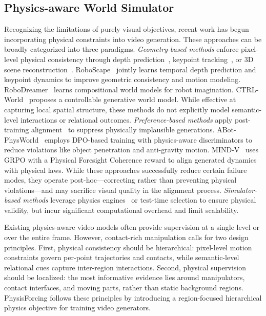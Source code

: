 \documentclass{llmxive}
\begin{document}
\subsection{Physics-aware World Simulator}

Recognizing the limitations of purely visual objectives, recent work has begun incorporating physical constraints into video generation. These approaches can be broadly categorized into three paradigms. \textit{Geometry-based methods} enforce pixel-level physical consistency through depth prediction~\cite{yang2024depth,video_depth_anything}, keypoint tracking~\cite{karaev2023cotracker,karaev24cotracker3,harley2025alltracker}, or 3D scene reconstruction~\cite{zhen2025tesseract}. RoboScape~\cite{shang2025roboscape} jointly learns temporal depth prediction and keypoint dynamics to improve geometric consistency and motion modeling. RoboDreamer~\cite{zhou2024robodreamer} learns compositional world models for robot imagination. CTRL-World~\cite{guo2025ctrl} proposes a controllable generative world model. While effective at capturing local spatial structure, these methods do not explicitly model semantic-level interactions or relational outcomes. \textit{Preference-based methods} apply post-training alignment~\cite{ouyang2022training,rafailov2024direct} to suppress physically implausible generations. ABot-PhysWorld~\cite{ali2025abot} employs DPO-based training with physics-aware discriminators to reduce violations like object penetration and anti-gravity motion. MIND-V~\cite{zhang2026mind} uses GRPO with a Physical Foresight Coherence reward to align generated dynamics with physical laws. While these approaches successfully reduce certain failure modes, they operate post-hoc—correcting rather than preventing physical violations—and may sacrifice visual quality in the alignment process. \textit{Simulator-based methods} leverage physics engines~\cite{wang2023robogen,yang2025physics} or test-time selection to ensure physical validity, but incur significant computational overhead and limit scalability.

Existing physics-aware video models often provide supervision at a single level or over the entire frame. However, contact-rich manipulation calls for two design principles. First, physical consistency should be hierarchical: pixel-level motion constraints govern per-point trajectories and contacts, while semantic-level relational cues capture inter-region interactions. Second, physical supervision should be localized: the most informative evidence lies around manipulators, contact interfaces, and moving parts, rather than static background regions. PhysisForcing follows these principles by introducing a region-focused hierarchical physics objective for training video generators.
\end{document}
